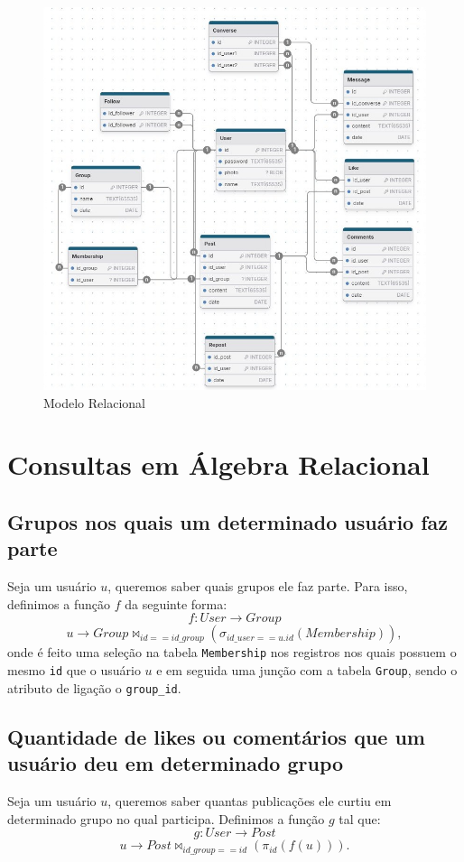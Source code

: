 \documentclass{article}
\begin{document}
\begin{figure}[!ht]
        \centering
        \includegraphics[width=1\textwidth]{imagens/mr.jpg}
        \caption{Modelo Relacional}
\end{figure}

\section{Consultas em Álgebra Relacional}
\subsection{Grupos nos quais um determinado usuário faz parte}
Seja um usuário $u$, queremos saber quais grupos ele faz parte. Para isso, definimos a função $f$ da seguinte forma:
$$f: User \rightarrow Group$$
$$u \rightarrow Group \bowtie_{id == id\_group} (\sigma_{id\_user == u.id}(Membership)),$$
onde é feito uma seleção na tabela \verb|Membership| nos registros nos quais possuem o mesmo \verb|id| que o usuário $u$ e em seguida uma junção com a tabela \verb|Group|, sendo o atributo de ligação o \verb|group_id|.

\subsection{Quantidade de likes ou comentários que um usuário deu em determinado grupo}
Seja um usuário $u$, queremos saber quantas publicações ele curtiu em determinado grupo no qual participa. Definimos a função $g$ tal que:
$$g: User \rightarrow Post$$
$$u \rightarrow Post \bowtie_{id\_group == id} (\pi_{id}(f(u))).$$
\end{document}
